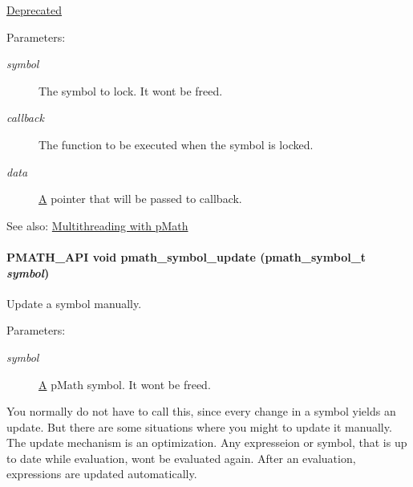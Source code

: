 \begin{Desc}
\item[\hyperlink{deprecated__deprecated000003}{Deprecated}]\end{Desc}
\begin{Desc}
\item[Parameters:]
\begin{description}
\item[{\em symbol}]The symbol to lock. It wont be freed. \item[{\em callback}]The function to be executed when the symbol is locked. \item[{\em data}]\hyperlink{class_a}{A} pointer that will be passed to callback.\end{description}
\end{Desc}
\begin{Desc}
\item[See also:]\hyperlink{group__threads}{Multithreading with pMath} \end{Desc}
\hypertarget{group__symbols_g7cd56e2b77ac13a11f1b6f7fd13ba357}{
\paragraph[{pmath\_\-symbol\_\-update}]{\setlength{\rightskip}{0pt plus 5cm}PMATH\_\-API void pmath\_\-symbol\_\-update ({\bf pmath\_\-symbol\_\-t} {\em symbol})}\hfill}
\label{group__symbols_g7cd56e2b77ac13a11f1b6f7fd13ba357}


Update a symbol manually. 

\begin{Desc}
\item[Parameters:]
\begin{description}
\item[{\em symbol}]\hyperlink{class_a}{A} pMath symbol. It wont be freed.\end{description}
\end{Desc}
You normally do not have to call this, since every change in a symbol yields an update. But there are some situations where you might to update it manually. The update mechanism is an optimization. Any expresseion or symbol, that is up to date while evaluation, wont be evaluated again. After an evaluation, expressions are updated automatically. 